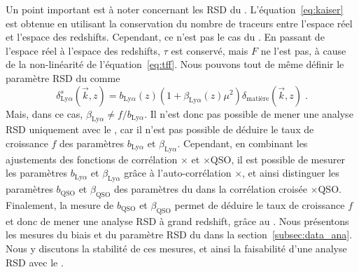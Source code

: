 Un point important est à noter concernant les RSD du \lya{}.
L'équation~\ref{eq:kaiser} est obtenue en utilisant la conservation du nombre de traceurs entre l'espace réel et l'espace des redshifts. Cependant, ce n'est pas le cas du \lya{}.
En passant de l'espace réel à l'espace des redshifts, $\tau$ est conservé, mais $F$ ne l'est pas, à cause de la non-linéarité de l'équation~\ref{eq:tff}.
Nous pouvons tout de même définir le paramètre RSD du \lya{} comme
\begin{equation}
  \label{eq:kaiser4}
  \delta_{\mathrm{Ly}\alpha}^{s}(\vec k, z) = b_{\mathrm{Ly}\alpha}(z) (1+ \beta_{\mathrm{Ly}\alpha}(z) \mu^2) \delta_{\mathrm{matière}}(\vec k, z)   \; .
\end{equation}
Mais, dans ce cas, $ \beta_{\mathrm{Ly}\alpha} \neq f / b_{\mathrm{Ly}\alpha}$.
Il n'est donc pas possible de mener une analyse RSD uniquement avec le \lya{}, car il n'est pas possible de déduire le taux de croissance $f$ des paramètres $b_{\mathrm{Ly}\alpha}$ et $\beta_{\mathrm{Ly}\alpha}$.
Cependant, en combinant les ajustements des fonctions de corrélation \lya{}$\times$\lya{} et \lya{}$\times$QSO, il est possible de mesurer les paramètres $b_{\mathrm{Ly}\alpha}$ et $\beta_{\mathrm{Ly}\alpha}$ grâce à l'auto-corrélation \lya{}$\times$\lya{}, et ainsi distinguer les paramètres $b_{\mathrm{QSO}}$ et $\beta_{\mathrm{QSO}}$ des paramètres du \lya{} dans la corrélation croisée \lya{}$\times$QSO. Finalement, la mesure de $b_{\mathrm{QSO}}$ et $\beta_{\mathrm{QSO}}$ permet de déduire le taux de croissance $f$ et donc de mener une analyse RSD à grand redshift, grâce au \lya{}.
Nous présentons les mesures du biais et du paramètre RSD du \lya{} dans la section~\ref{subsec:data_ana}. Nous y discutons la stabilité de ces mesures, et ainsi la faisabilité d'une analyse RSD avec le \lya{}.

